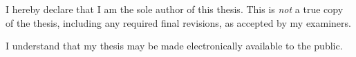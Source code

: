 \chapter*{}

\mbox{}\vfill

\newlength{\oldparskip}
\setlength{\oldparskip}{\parskip}

\begin{center}
\begin{minipage}{0.6\textwidth}
\setlength{\parindent}{\oldparindent}
\setlength{\parskip}{\oldparskip}
I hereby declare that I am the sole author of this thesis.
This is \emph{not} a true copy of the thesis, including any required final revisions, as accepted by my examiners.

I understand that my thesis may be made electronically available to the public.
\end{minipage}
\end{center}

\vfill
\vfill
\vfill
